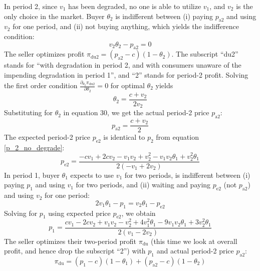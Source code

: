 \documentclass[isre,blindrev]{informs3} %
\begin{document}
In period 2, since \(v_1\) has been degraded, no one is able to utilize \(v_1\), and \(v_2\) is the only choice in the market. Buyer \(\theta _2\) is indifferent between (i) paying \(p_{\text{a2}}\) and using \(v_2\) for one period, and (ii) not buying anything, which yields the indifference condition:
\begin{equation}
v_2\theta _2-p_{\text{a2}}=0
\end{equation}
The seller optimizes profit \(\pi _{\text{du2}}= \left(p_{\text{a2}}-c\right)\left(1-\theta _2\right)\). The subscript {``}du2{''} stands for {``}with
degradation in period 2, and with consumers unaware of the impending degradation in period 1{''}, and {``}2{''} stands for period-2 profit. Solving
the first order condition \(\frac{\partial _{\theta _2}\pi _{\text{du2}}}{\partial \theta _2}=0\) for optimal \(\theta _2\) yields
\begin{equation}
\theta _2=\frac{c+v_2}{2 v_2}
\end{equation}
Substituting for \(\theta _2\) in equation 30, we get the actual period-2 price \(p_{\text{a2}}\):
\begin{equation}
p_{\text{a2}}=\frac{c+v_2}{2 }
\end{equation}
The expected period-2 price \(p_{\text{e2}}\) is identical to \(p_2\) from equation \ref{p_2_no_degrade}:
\begin{equation}
p_{\text{e2}}=\frac{-c v_1+2 c v_2-v_1 v_2+v_2^2-v_1 v_2 \theta _1+v_2^2 \theta _1}{2 \left(-v_1+2 v_2\right)}
\end{equation}
In period 1, buyer \(\theta _1\) expects to use \(v_1\) for two periods, is indifferent between (i) paying \(p_1\) and using \(v_1\) for two periods,
and (ii) waiting and paying \(p_{\text{e2}}\) (not \(p_{\text{a2}}\)) and using \(v_2\) for one period:
\begin{equation}
2 v_1\theta _1-p_1=v_2\theta _1-p_{\text{e2}}
\end{equation}
Solving for \(p_1\) using expected price \(p_{\text{e2}}\), we obtain
\begin{equation}
p_1=\frac{c v_1-2 c v_2+v_1 v_2-v_2^2+4 v_1^2 \theta _1-9 v_1 v_2 \theta _1+3 v_2^2 \theta _1}{2 \left(v_1-2 v_2\right)}
\end{equation}
The seller optimizes their two-period profit \(\pi _{\text{du}}\) (this time we look at overall profit, and hence drop the subscript {``}2{''}) with
\(p_1\) and actual period-2 price \(p_{\text{a2}}\):
\begin{equation}
\pi _{\text{du}}=\left(p_1-c\right)\left(1-\theta _1\right)+\left(p_{\text{a2}}-c\right)\left(1-\theta _2\right)
\end{equation}
\end{document}
